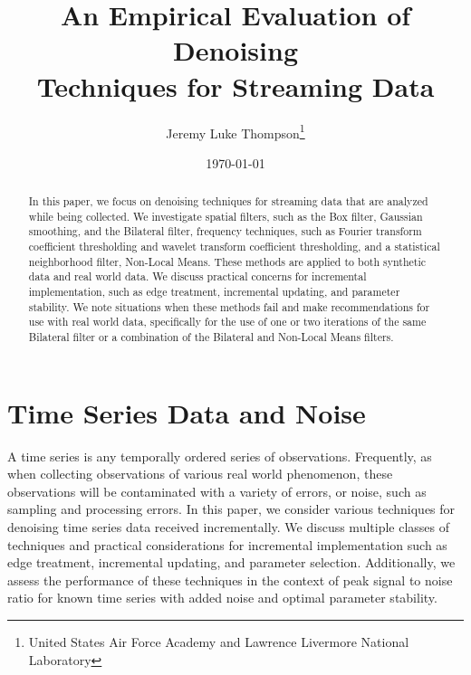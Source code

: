 \documentclass[11pt]{article}
\theoremstyle{definition}
\begin{document}
\title{An Empirical Evaluation of Denoising\\Techniques for Streaming Data}

\date{\today}

%

\author{Jeremy Luke Thompson\thanks{United States Air Force Academy and Lawrence Livermore National Laboratory}}


\maketitle


\begin{abstract}
In this paper, we focus on denoising techniques for streaming data that are analyzed while being collected. We investigate spatial filters, such as the Box filter, Gaussian smoothing, and the Bilateral filter, frequency techniques, such as Fourier transform coefficient thresholding and wavelet transform coefficient thresholding, and a statistical neighborhood filter, Non-Local Means. These methods are applied to both synthetic data and real world data. We discuss practical concerns for incremental implementation, such as edge treatment, incremental updating, and parameter stability. We note situations when these methods fail and make recommendations for use with real world data, specifically for the use of one or two iterations of the same Bilateral filter or a combination of the Bilateral and Non-Local Means filters.
\end{abstract}






\pagestyle{plain}




 
\section{Time Series Data and Noise}

A time series is any temporally ordered series of observations. Frequently, as when collecting observations of various real world phenomenon, these observations will be contaminated with a variety of errors, or noise, such as sampling and processing errors. In this paper, we consider various techniques for denoising time series data received incrementally. We discuss multiple classes of techniques and practical considerations for incremental implementation such as edge treatment, incremental updating, and parameter selection. Additionally, we assess the performance of these techniques in the context of peak signal to noise ratio for known time series with added noise and optimal parameter stability.
\end{document}
